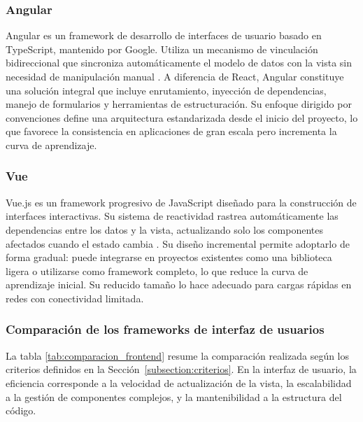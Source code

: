 \subsubsection{Angular}

Angular es un framework de desarrollo de interfaces de usuario basado en TypeScript, mantenido por Google. 
Utiliza un mecanismo de vinculación bidireccional que sincroniza automáticamente el modelo de datos con la vista sin necesidad de manipulación manual \cite{angular_official}.
A diferencia de React, Angular constituye una solución integral que incluye enrutamiento, inyección de dependencias, manejo de formularios y herramientas de estructuración. 
Su enfoque dirigido por convenciones define una arquitectura estandarizada desde el inicio del proyecto, lo que favorece la consistencia en aplicaciones de gran escala pero incrementa la curva de aprendizaje.

\subsubsection{Vue}

Vue.js es un framework progresivo de JavaScript diseñado para la construcción de interfaces interactivas. 
Su sistema de reactividad rastrea automáticamente las dependencias entre los datos y la vista, actualizando solo los componentes afectados cuando el estado cambia \cite{vue_official}. 
Su diseño incremental permite adoptarlo de forma gradual: puede integrarse en proyectos existentes como una biblioteca ligera o utilizarse como framework completo, lo que reduce la curva de aprendizaje inicial.
Su reducido tamaño lo hace adecuado para cargas rápidas en redes con conectividad limitada.

\subsubsection{Comparación de los frameworks de interfaz de usuarios}

La tabla \ref{tab:comparacion_frontend} resume la comparación realizada según los criterios definidos en la Sección~\ref{subsection:criterios}. 
En la interfaz de usuario, la eficiencia corresponde a la velocidad de actualización de la vista, la escalabilidad a la gestión de componentes complejos, y la mantenibilidad a la estructura del código.

